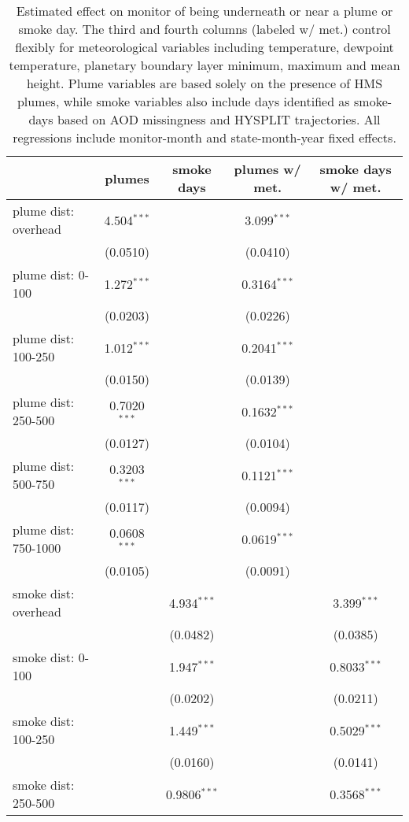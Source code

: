 \begin{table}[H]
\caption{Estimated effect on monitor \pmt of being underneath or near a plume or smoke day. The third and fourth columns (labeled w/ met.) control flexibly for meteorological variables including temperature, dewpoint temperature, planetary boundary layer minimum, maximum and mean height. Plume variables are based solely on the presence of HMS plumes, while smoke variables also include days identified as smoke-days based on AOD missingness and HYSPLIT trajectories. All regressions include monitor-month and state-month-year fixed effects.}
\begin{tabular}{lcccc}
\tabularnewline\midrule\midrule
  & plumes & smoke days & plumes w/ met. & smoke days w/ met.\\
\midrule
plume dist: overhead&4.504$^{***}$ &    & 3.099$^{***}$ &   \\
  &(0.0510) &    & (0.0410) &   \\
plume dist: 0-100&1.272$^{***}$ &    & 0.3164$^{***}$ &   \\
  &(0.0203) &    & (0.0226) &   \\
plume dist: 100-250&1.012$^{***}$ &    & 0.2041$^{***}$ &   \\
  &(0.0150) &    & (0.0139) &   \\
plume dist: 250-500&0.7020$^{***}$ &    & 0.1632$^{***}$ &   \\
  &(0.0127) &    & (0.0104) &   \\
plume dist: 500-750&0.3203$^{***}$ &    & 0.1121$^{***}$ &   \\
  &(0.0117) &    & (0.0094) &   \\
plume dist: 750-1000&0.0608$^{***}$ &    & 0.0619$^{***}$ &   \\
  &(0.0105) &    & (0.0091) &   \\
smoke dist: overhead&   & 4.934$^{***}$ &    & 3.399$^{***}$\\
  &   & (0.0482) &    & (0.0385)\\
smoke dist: 0-100&   & 1.947$^{***}$ &    & 0.8033$^{***}$\\
  &   & (0.0202) &    & (0.0211)\\
smoke dist: 100-250&   & 1.449$^{***}$ &    & 0.5029$^{***}$\\
  &   & (0.0160) &    & (0.0141)\\
smoke dist: 250-500&   & 0.9806$^{***}$ &    & 0.3568$^{***}$\\

\end{tabular}
\end{table}
